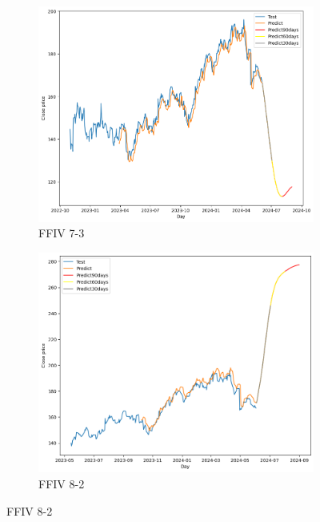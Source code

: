 \documentclass{ieeeojies}
\begin{document}
\begin{figure}[H]
    \centering
    \begin{subfigure}[b]{0.33\linewidth}
        \centering
        \includegraphics[width=\linewidth]{LSTM Plot/FFIV_LSTM_7_3.png}
        \caption{FFIV 7-3}
        \label{fig:ffiv-7-3}
    \end{subfigure}%
    \hfill
    \begin{subfigure}[b]{0.33\linewidth}
        \centering
        \includegraphics[width=\linewidth]{LSTM Plot/FFIV_LSTM_8_2.png}
        \caption{FFIV 8-2}
        \label{fig:ffiv-8-2}
    \end{subfigure}%

\end{figure}
\end{document}
